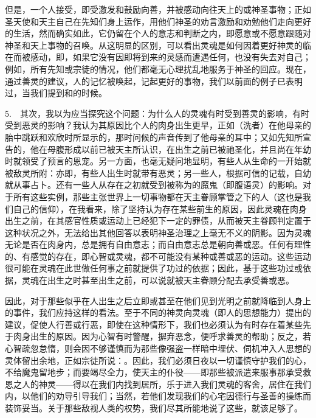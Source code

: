 但是，一个人接受，即受激发和鼓励向善，并被感动向往天上的或神圣事物；正如圣天使和天主自己在先知们身上运作，用他们神圣的劝言激励和劝勉他们走向更好的生活，然而确实如此，它仍留在个人的意志和判断之内，即愿意或不愿意跟随对神圣和天上事物的召唤。从这明显的区别，可以看出灵魂是如何因着更好神灵的临在而被感动，即，如果它没有因即将到来的灵感而遭遇任何，也没有失去对自己；例如，所有先知或宗徒的情况，他们都毫无心理扰乱地服务于神圣的回应。现在，通过善灵的建议，人的记忆被唤起，记起更好的事物，我们以前面的例子已表明过，当我们提到和的时候。\par

5.　其次，我以为应当探究这个问题：为什么人的灵魂有时受到善灵的影响，有时受到恶灵的影响？我认为其原因比个人的肉身出生更早，正如（洗者）在他母亲的胎中跳跃和欢欣时所显示的，那时问候的声音传到了他母亲的耳中；又如先知所宣告的，他在母腹形成以前已被天主所认识，在出生之前已被祂圣化，并且尚在年幼时就领受了预言的恩宠。另一方面，也毫无疑问地显明，有些人从生命的一开始就被敌灵所附：亦即，有些人出生时就带有恶灵；另一些人，根据可信的记载，自幼就从事占卜。还有一些人从存在之初就受到被称为的魔鬼（即腹语灵）的影响。对于所有这些实例，那些主张世界上一切事物都在天主眷顾掌管之下的人（这也是我们自己的信仰），在我看来，除了坚持认为存在某些前生的原因，因此灵魂在肉身出生之前，在其感官性质或运动上已经犯下一定的罪债，从而被天主眷顾判定置于这种状况之外，无法给出其他回答以表明神圣治理之上毫无不义的阴影。因为灵魂无论是否在肉身内，总是拥有自由意志；而自由意志总是朝向善或恶。任何有理性的、有感觉的存在，即心智或灵魂，都不可能没有某种或善或恶的运动。这些运动很可能在灵魂在此世做任何事之前就提供了功过的依据；因此，基于这些功过或依据，灵魂在出生之时甚至出生之前，可以说就被天主眷顾分配去承受善或恶。\par

因此，对于那些似乎在人出生之后立即或甚至在他们见到光明之前就降临到人身上的事件，我们应持这样的看法。至于不同的神灵向灵魂（即人的思想能力）提出的建议，促使人行善或行恶，即使在这种情形下，我们也必须认为有时存在着某些先于肉身出生的原因。因为心智有时警醒，摒弃恶念，便呼求善灵的帮助；反之，若心智疏忽怠惰，则会因不够谨慎而为那些像强盗一样暗中埋伏、伺机冲入人思想的灵体留出余地，正如宗徒所说：。因此，我们必须日夜以一切谨慎守护我们的心，不给魔鬼留地步；而要竭尽全力，使天主的仆役——即那些被派遣来服事那承受救恩之人的神灵——得以在我们内找到居所，乐于进入我们灵魂的客舍，居住在我们内，以他们的劝导引导我们；当然，若他们发现我们的心宅因德行与圣善的操练而装饰妥当。关于那些敌视人类的权势，我们尽其所能地说了这些，就该足够了。\par


